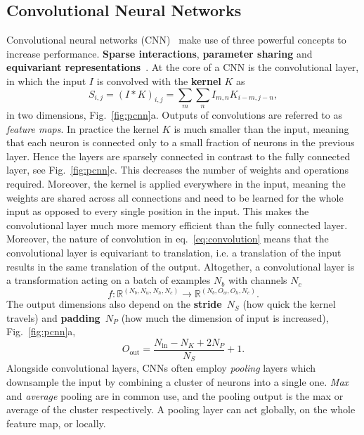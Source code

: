 \subsection{Convolutional Neural Networks}
\label{subsec:nn-cnn} 
Convolutional neural networks (CNN)~\cite{lecun1989generalization} make use of three powerful concepts to increase performance. \textbf{Sparse interactions}, \textbf{parameter sharing} and \textbf{equivariant representations}~\cite{goodfellow2016deep}. At the core of a CNN is the {convolutional} layer, in which the input $I$ is convolved with the \textbf{kernel} $K$ as 
\begin{equation}
	\label{eq:convolution}
	S_{i,j} = (I * K)_{i,j} = \sum_m \sum_n I_{m,n} K_{i-m, j-n},
\end{equation}
in two dimensions, Fig.~\ref{fig:pcnn}a. Outputs of convolutions are referred to as \emph{feature maps}. In practice the kernel $K$ is much smaller than the input, meaning that each neuron is connected only to a small fraction of neurons in the previous layer. Hence the layers are sparsely connected in contrast to the fully connected layer, see Fig.~\ref{fig:pcnn}c. This decreases the number of weights and operations required. Moreover, the kernel is applied everywhere in the input, meaning the weights are shared across all connections and need to be learned for the whole input as opposed to every single position in the input. This makes the convolutional layer much more memory efficient than the fully connected layer. Moreover, the nature of convolution in eq.~\eqref{eq:convolution} means that the convolutional layer is equivariant to translation, i.e. a translation of the input results in the same translation of the output. Altogether, a convolutional layer is a transformation acting on a batch of examples $N_b$ with channels $N_c$
\begin{equation}
	f: \mathbb{R}^{(N_b, N_w, N_h, N_c)} \rightarrow \mathbb{R}^{(N_b, O_w, O_h, N_c)}.
\end{equation}
The output dimensions also depend on the \textbf{stride}~$N_S$ (how quick the kernel travels) and \textbf{padding}~$N_P$ (how much the dimension of input is increased), Fig.~\ref{fig:pcnn}a,
\begin{equation}
	O_{\text{out}} = \frac{N_{\text{in}}-N_K+2N_P}{N_S}+1.
\end{equation}
Alongside convolutional layers, CNNs often employ \emph{pooling} layers which downsample the input by combining a cluster of neurons into a single one. \emph{Max} and \emph{average} pooling are in common use, and the pooling output is the max or average of the cluster respectively. A pooling layer can act globally, on the whole feature map, or locally. 

